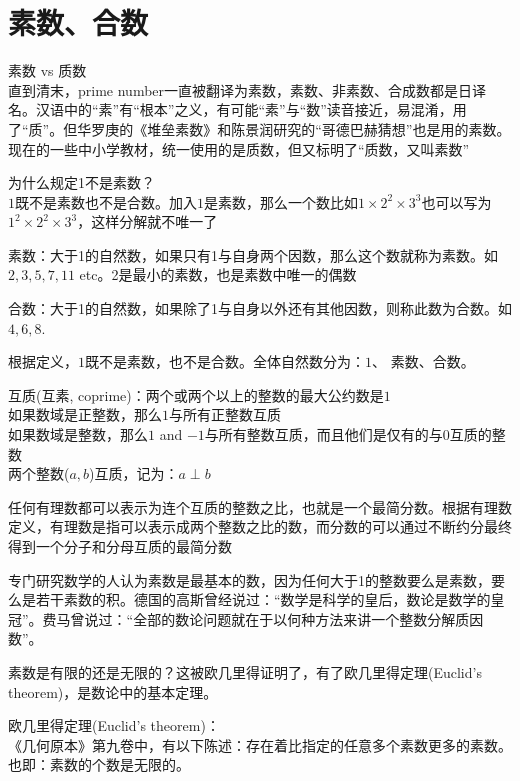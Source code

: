 \documentclass[../main.tex]{subfiles}
\begin{document}
\clearpage
\section{素数、合数}
素数 vs 质数\\
直到清末，prime number一直被翻译为素数，素数、非素数、合成数都是日译名。汉语中的“素”有“根本”之义，有可能“素”与“数”读音接近，易混淆，用了“质”。但华罗庚的《堆垒素数》和陈景润研究的“哥德巴赫猜想”也是用的素数。现在的一些中小学教材，统一使用的是质数，但又标明了“质数，又叫素数”

为什么规定1不是素数？\\
$1$既不是素数也不是合数。加入$1$是素数，那么一个数比如$1\times 2^2 \times 3^3$也可以写为$1^2\times 2^2 \times 3^3$，这样分解就不唯一了

素数：大于1的自然数，如果只有1与自身两个因数，那么这个数就称为素数。如$2, 3, 5, 7, 11$ etc。2是最小的素数，也是素数中唯一的偶数

合数：大于1的自然数，如果除了1与自身以外还有其他因数，则称此数为合数。如$4, 6, 8$.

根据定义，$1$既不是素数，也不是合数。全体自然数分为：$1$、 素数、合数。

互质(互素, coprime)：两个或两个以上的整数的最大公约数是$1$\\
如果数域是正整数，那么$1$与所有正整数互质\\
如果数域是整数，那么$1$ and $-1$与所有整数互质，而且他们是仅有的与$0$互质的整数\\
两个整数($a,b$)互质，记为：$a \perp b$

任何有理数都可以表示为连个互质的整数之比，也就是一个最简分数。根据有理数定义，有理数是指可以表示成两个整数之比的数，而分数的可以通过不断约分最终得到一个分子和分母互质的最简分数

专门研究数学的人认为素数是最基本的数，因为任何大于1的整数要么是素数，要么是若干素数的积。德国的高斯曾经说过：“数学是科学的皇后，数论是数学的皇冠”。费马曾说过：“全部的数论问题就在于以何种方法来讲一个整数分解质因数”。

素数是有限的还是无限的？这被欧几里得证明了，有了欧几里得定理(Euclid's theorem)，是数论中的基本定理。

欧几里得定理(Euclid's theorem)：\\
《几何原本》第九卷中，有以下陈述：存在着比指定的任意多个素数更多的素数。也即：素数的个数是无限的。
\end{document}
